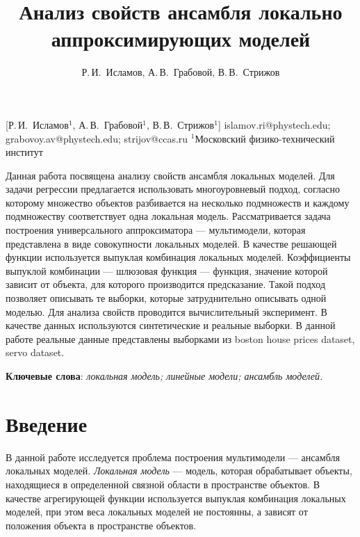\documentclass[12pt, twoside]{article}
\begin{document}
\title
    [Анализ свойств ансамбля локально аппроксимирующих моделей] %
    {Анализ свойств ансамбля локально аппроксимирующих моделей}
\author
    [Р.\,И.~Исламов, А.\,В.~Грабовой, В.\,В.~Стрижов] %
    {Р.\,И.~Исламов, А.\,В.~Грабовой, В.\,В.~Стрижов} %
    [Р.\,И.~Исламов$^1$, А.\,В.~Грабовой$^1$, В.\,В.~Стрижов$^{1}$] %
\email
    {islamov.ri@phystech.edu; grabovoy.av@phystech.edu;  strijov@ccas.ru}
\organization
    {$^1$Московский физико-технический институт}
\abstract
    {Данная работа посвящена анализу свойств ансамбля локальных моделей. Для задачи регрессии  предлагается использовать многоуровневый подход, согласно которому множество объектов разбивается на несколько подмножеств и каждому подмножеству соответствует одна локальная модель. Рассматривается задача построения универсального аппроксиматора --- мультимодели, которая представлена в виде совокупности локальных моделей. В качестве решающей функции используется выпуклая комбинация локальных моделей.  Коэффициенты выпуклой комбинации --- шлюзовая функция --- функция, значение которой зависит от объекта, для которого производится предсказание. Такой подход позволяет описывать те выборки, которые затруднительно описывать одной моделью. Для анализа свойств проводится вычислительный эксперимент. В качестве данных используются синтетические и реальные выборки. В данной работе реальные данные представлены выборками из boston house prices dataset, servo dataset.  
	
\bigskip
\noindent
\textbf{Ключевые слова}: \emph {локальная модель; линейные модели; ансамбль моделей.}
}

\maketitle
\linenumbers

\section{Введение}
В данной работе исследуется проблема построения мультимодели --- ансамбля локальных моделей. \textit{Локальная модель} --- модель, которая обрабатывает объекты, находящиеся в определенной связной области в пространстве объектов. В качестве агрегирующей функции используется выпуклая комбинация локальных моделей, при этом веса локальных моделей не постоянны, а зависят от положения объекта в пространстве объектов. 
\end{document}
